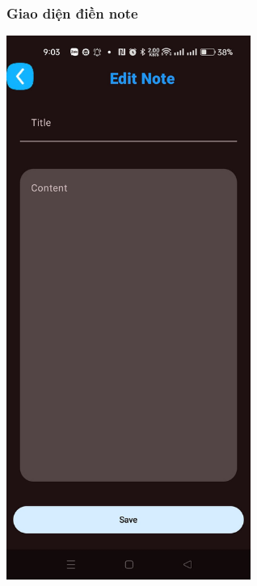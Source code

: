 \documentclass[a4paper,12pt]{article}
\begin{document}
\subsubsection{Giao diện điền note}
\includegraphics[width=0.6\textwidth]{GiaoDiendiennote.png}
\clearpage
\end{document}
